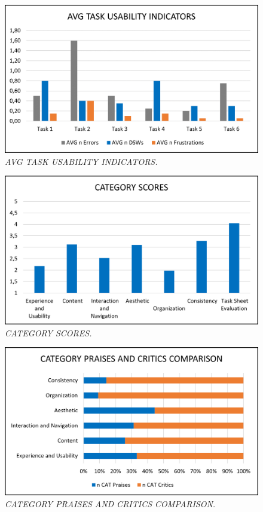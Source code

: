 \begin{figure}[h]
	\includegraphics[width=\textwidth]{UT_Visual_illustration_4.png}
	\caption{\textit{AVG TASK USABILITY INDICATORS.}}
	\label{fig:label4}
\end{figure}
\begin{figure}[h]
	\includegraphics[width=\textwidth]{UT_Visual_illustration_5.png}
	\caption{\textit{CATEGORY SCORES.}}
	\label{fig:label5}
\end{figure}
\begin{figure}[h]
	\includegraphics[width=\textwidth]{UT_Visual_illustration_6.png}
	\caption{\textit{CATEGORY PRAISES AND CRITICS COMPARISON.}}
	\label{fig:label6}
\end{figure}
